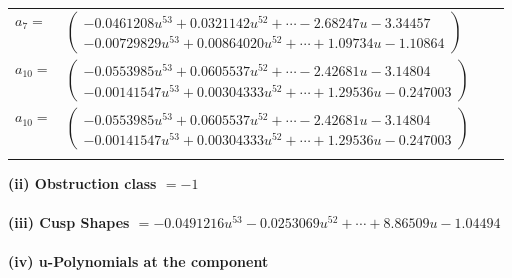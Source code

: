 \documentclass[1p]{elsarticle_modified}
\theoremstyle{definition}
\begin{document}
\begin{tabular}{m{7pt} m{180pt} m{7pt} m{180pt} }
\flushright $a_{7}=$&$\begin{pmatrix}-0.0461208 u^{53}+0.0321142 u^{52}+\cdots-2.68247 u-3.34457\\-0.00729829 u^{53}+0.00864020 u^{52}+\cdots+1.09734 u-1.10864\end{pmatrix}$ \\
\flushright $a_{10}=$&$\begin{pmatrix}-0.0553985 u^{53}+0.0605537 u^{52}+\cdots-2.42681 u-3.14804\\-0.00141547 u^{53}+0.00304333 u^{52}+\cdots+1.29536 u-0.247003\end{pmatrix}$\\ \flushright $a_{10}=$&$\begin{pmatrix}-0.0553985 u^{53}+0.0605537 u^{52}+\cdots-2.42681 u-3.14804\\-0.00141547 u^{53}+0.00304333 u^{52}+\cdots+1.29536 u-0.247003\end{pmatrix}$\\&\end{tabular}
\flushleft \textbf{(ii) Obstruction class $= -1$}\\~\\
\flushleft \textbf{(iii) Cusp Shapes $= -0.0491216 u^{53}-0.0253069 u^{52}+\cdots+8.86509 u-1.04494$}\\~\\
\newpage\renewcommand{\arraystretch}{1}
\flushleft \textbf{(iv) u-Polynomials at the component}\newline \\
\end{document}
